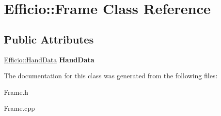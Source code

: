 \hypertarget{class_efficio_1_1_frame}{}\section{Efficio\+:\+:Frame Class Reference}
\label{class_efficio_1_1_frame}
\subsection*{Public Attributes}
\begin{DoxyCompactItemize}
\item 
\hyperlink{class_efficio_1_1_hand_data}{Efficio\+::\+Hand\+Data} {\bfseries Hand\+Data}\hypertarget{class_efficio_1_1_frame_a546f841f8294491f08c83ef16e5b421c}{}\label{class_efficio_1_1_frame_a546f841f8294491f08c83ef16e5b421c}

\end{DoxyCompactItemize}


The documentation for this class was generated from the following files\+:\begin{DoxyCompactItemize}
\item 
Frame.\+h\item 
Frame.\+cpp\end{DoxyCompactItemize}
